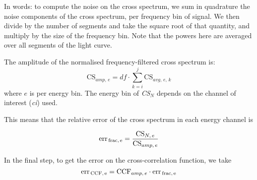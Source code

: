 \documentclass[11pt, oneside, reqno, a4paper]{article}
\newcommand{\be}{\begin{equation}}
\newcommand{\ee}{\end{equation}}
\theoremstyle{plain}
\numberwithin{equation}{section}
\begin{document}
In words: 
to compute the noise on the cross spectrum, we sum in quadrature the noise components of the cross spectrum, per frequency bin of signal. We then divide by the number of segments and take the square root of that quantity, and multiply by the size of the frequency bin. Note that the powers here are averaged over all segments of the light curve.

The amplitude of the normalised frequency-filtered cross spectrum is:
\be
\text{CS}_{amp,\,e} =  df \cdot \sum^j_{k=i} \text{CS}_{avg,\,e,\,k}
\ee
where $e$ is per energy bin. The energy bin of \textit{CS}$_N$ depends on the channel of interest (\textit{ci}) used.

This means that the relative error of the cross spectrum in each energy channel is 

\be
\text{err}_\text{\,frac,\,e} = \frac{\text{CS}_{N,\,e}}{\text{CS}_{amp,\,e}}
\ee

In the final step, to get the error on the cross-correlation function, we take 
\be
\text{err}_\text{\,CCF,\,e} = \text{CCF}_{amp,\,e} \cdot \text{err}_\text{\,frac,\,e}
\ee
\end{document}
